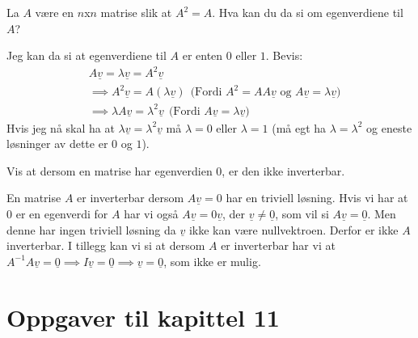 \documentclass[11pt, a4paper, norsk]{NTNUoving}
\begin{document}
    \begin{oppgave}
        La $A$ være en $n$x$n$ matrise slik at $A^2 = A$. Hva kan du da si om egenverdiene til $A$?

        Jeg kan da si at egenverdiene til $A$ er enten $0$ eller $1$. Bevis:
        \begin{align*}
           &A\underline{v} = \lambda\underline{v} = A^2\underline{v}
           \\
           &\implies A^2\underline{v} = A(\lambda\underline{v}) \: \: \text{(Fordi $A^2 = AA\underline{v}$ og $A\underline{v} = \lambda\underline{v}$)}
           \\
           &\implies \lambda A\underline{v} = \lambda^2\underline{v} \: \: \text{(Fordi $A\underline{v} = \lambda\underline{v}$)}
        \end{align*}
        Hvis jeg nå skal ha at $\lambda\underline{v} = \lambda^2\underline{v}$ må $\lambda = 0$ eller $\lambda = 1$ (må egt ha $\lambda = \lambda^2$ og eneste løsninger av dette er $0$ og $1$).
    \end{oppgave}
    \begin{oppgave}
        Vis at dersom en matrise har egenverdien $0$, er den ikke inverterbar.

        En matrise $A$ er inverterbar dersom $A\underline{v} = 0$ har en triviell løsning. Hvis vi har at $0$ er en egenverdi for $A$ har vi også $A\underline{v} = 0\underline{v}$, der $\underline{v} \neq \underline{0}$, som vil si $A\underline{v} = \underline{0}$. Men denne har ingen triviell løsning da $\underline{v}$ ikke kan være nullvektroen. Derfor er ikke $A$ inverterbar. I tillegg kan vi si at dersom $A$ er inverterbar har vi at $A^{-1}A\underline{v} = \underline{0} \implies I\underline{v} = \underline{0} \implies \underline{v} = \underline{0}$, som ikke er mulig.
    \end{oppgave}

    \section*{Oppgaver til kapittel 11}
    
\end{document}
